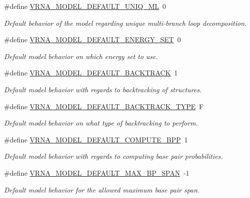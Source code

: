 \begin{DoxyCompactItemize}
\#define \hyperlink{group__model__details_ga63f6006a02ba2d89148441f406c309e7}{V\+R\+N\+A\+\_\+\+M\+O\+D\+E\+L\+\_\+\+D\+E\+F\+A\+U\+L\+T\+\_\+\+U\+N\+I\+Q\+\_\+\+ML}~0
\begin{DoxyCompactList}\small\item\em Default behavior of the model regarding unique multi-\/branch loop decomposition. \end{DoxyCompactList}\item 
\#define \hyperlink{group__model__details_ga6fcf6b2d0f89256cdbd166486c9b6e1e}{V\+R\+N\+A\+\_\+\+M\+O\+D\+E\+L\+\_\+\+D\+E\+F\+A\+U\+L\+T\+\_\+\+E\+N\+E\+R\+G\+Y\+\_\+\+S\+ET}~0
\begin{DoxyCompactList}\small\item\em Default model behavior on which energy set to use. \end{DoxyCompactList}\item 
\#define \hyperlink{group__model__details_ga3fda8006ab84baf817bd8e5ccbc6bb35}{V\+R\+N\+A\+\_\+\+M\+O\+D\+E\+L\+\_\+\+D\+E\+F\+A\+U\+L\+T\+\_\+\+B\+A\+C\+K\+T\+R\+A\+CK}~1
\begin{DoxyCompactList}\small\item\em Default model behavior with regards to backtracking of structures. \end{DoxyCompactList}\item 
\#define \hyperlink{group__model__details_gad0e81fcaca53c4a826c68e0796de2afb}{V\+R\+N\+A\+\_\+\+M\+O\+D\+E\+L\+\_\+\+D\+E\+F\+A\+U\+L\+T\+\_\+\+B\+A\+C\+K\+T\+R\+A\+C\+K\+\_\+\+T\+Y\+PE}~\textquotesingle{}F\textquotesingle{}
\begin{DoxyCompactList}\small\item\em Default model behavior on what type of backtracking to perform. \end{DoxyCompactList}\item 
\#define \hyperlink{group__model__details_ga1d6cd5051940b126c248147c011bac6c}{V\+R\+N\+A\+\_\+\+M\+O\+D\+E\+L\+\_\+\+D\+E\+F\+A\+U\+L\+T\+\_\+\+C\+O\+M\+P\+U\+T\+E\+\_\+\+B\+PP}~1
\begin{DoxyCompactList}\small\item\em Default model behavior with regards to computing base pair probabilities. \end{DoxyCompactList}\item 
\#define \hyperlink{group__model__details_ga7cb6f4ae8fdebff6746a4410814f2977}{V\+R\+N\+A\+\_\+\+M\+O\+D\+E\+L\+\_\+\+D\+E\+F\+A\+U\+L\+T\+\_\+\+M\+A\+X\+\_\+\+B\+P\+\_\+\+S\+P\+AN}~-\/1
\begin{DoxyCompactList}\small\item\em Default model behavior for the allowed maximum base pair span. \end{DoxyCompactList}\item 

\end{DoxyCompactItemize}
